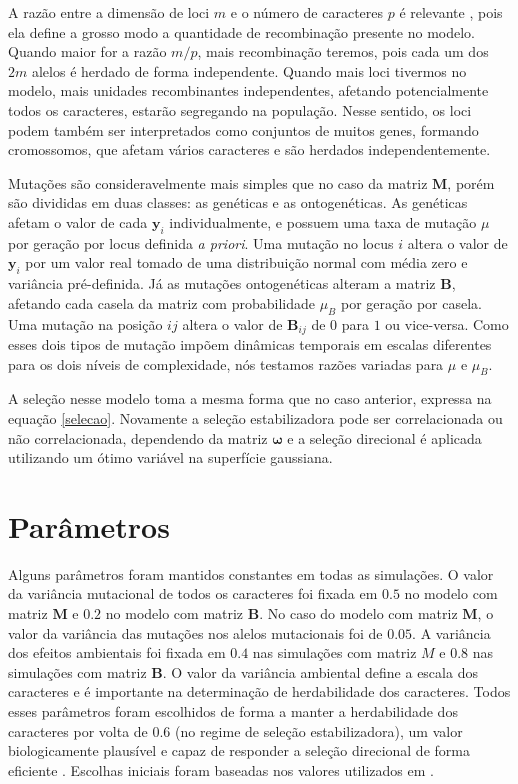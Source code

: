 A razão entre a dimensão de loci $m$ e o número de caracteres $p$ é
relevante \citep{Wagner1984}, pois ela define a grosso modo a quantidade
de recombinação presente no modelo.
Quando maior for a razão $m/p$, mais recombinação teremos, pois cada um
dos $2m$ alelos é herdado de forma independente.
Quando mais loci tivermos no modelo, mais unidades recombinantes
independentes, afetando potencialmente todos os caracteres, estarão
segregando na população.
Nesse sentido, os loci podem também ser interpretados como conjuntos de
muitos genes, formando cromossomos, que afetam vários caracteres e são
herdados independentemente.

Mutações são consideravelmente mais simples que no caso da matriz
$\mathbf{M}$, porém são divididas em duas classes: as genéticas e as
ontogenéticas.
As genéticas afetam o valor de cada $\mathbf{y}_i$ individualmente, e
possuem uma taxa de mutação $\mu$ por geração por locus definida {\it a
priori}.
Uma mutação no locus $i$ altera o valor de $\mathbf{y}_i$ por um valor real tomado
de uma distribuição normal com média zero e variância pré-definida.
Já as mutações ontogenéticas alteram a matriz $\mathbf{B}$, afetando cada casela
da matriz com probabilidade $\mu_B$ por geração por casela.
Uma mutação na posição $ij$ altera o valor de $\mathbf{B}_{ij}$ de $0$ para $1$
ou vice-versa.
Como esses dois tipos de mutação impõem dinâmicas temporais em escalas
diferentes para os dois níveis de complexidade, nós testamos razões
variadas para $\mu$ e $\mu_B$.

A seleção nesse modelo toma a mesma forma que no caso anterior, expressa
na equação \ref{selecao}.
Novamente a seleção estabilizadora pode ser correlacionada ou não
correlacionada, dependendo da matriz $\pmb{\omega}$ e a seleção direcional é
aplicada utilizando um ótimo variável na superfície gaussiana.

\section{Parâmetros}\label{cap2:parametros}

Alguns parâmetros foram mantidos constantes em todas as simulações.
O valor da variância mutacional de todos os caracteres foi fixada em
$0.5$ no modelo com matriz $\mathbf{M}$ e $0.2$ no modelo com matriz
$\mathbf{B}$.
No caso do modelo com matriz $\mathbf{M}$, o valor da variância das
mutações nos alelos mutacionais foi de $0.05$.
A variância dos efeitos ambientais foi fixada em $0.4$ nas simulações com
matriz $M$ e $0.8$ nas simulações com matriz $\mathbf{B}$.
O valor da variância ambiental define a escala dos caracteres e é
importante na determinação de herdabilidade dos caracteres.
Todos esses parâmetros foram escolhidos de forma a manter a
herdabilidade dos caracteres por volta de $0.6$ (no regime de seleção
estabilizadora), um valor biologicamente plausível e capaz de responder
a seleção direcional de forma eficiente \citep{Cheverud1988}.
Escolhas iniciais foram baseadas nos valores utilizados em
\cite{Jones2003, Jones2004, Jones2007}.

